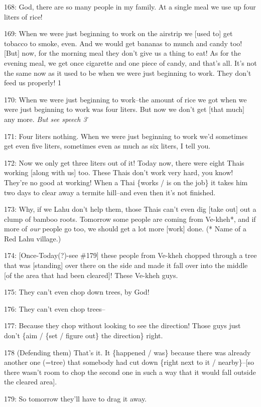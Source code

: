 168: God, there are so many people in my family. At a single meal we use up four
liters of rice!

169: When we were just beginning to work on the airstrip we [used to] get tobacco
to smoke, even. And we would get bananas to munch and candy too! [But] now, for
the morning meal they don't give us a thing to eat! As for the evening meal, we
get once cigarette and one piece of candy, and that's all. It's not the same now
as it used to be when we were just beginning to work. They don't feed us properly!
1

170: When we were just beginning to work--the amount of rice we got when we were
just beginning to work was four liters. But now we don't get [that much] any more.
\textit{But see speech 3\.}

171: Four liters nothing. When we were just beginning to work we'd sometimes get
even five liters, sometimes even as much as six liters, I tell you.

172: Now we only get three liters out of it! Today now, there were eight Thais
working [along with us] too. These Thais don't work very hard, you know! They're
no good at working! When a Thai \{works / is on the job\} it takes him two days
to clear away a termite hill--and even then it's not finished.

173: Why, if we Lahu don't help them, those Thais can't even dig [take out] out
a clump of bamboo roots. Tomorrow some people are coming from Ve-kheh*, and if
more of \textit{our} people go too, we should get a lot more [work] done. (* Name
of a Red Lahu village.)

174: [Once-Today(?)-see \#179] these people from Ve-kheh chopped through a tree
that was [standing] over there on the side and made it fall over into the middle
[of the area that had been cleared]! These Ve-kheh guys.

175: They can't even chop down trees, by God!

176: They can't even chop trees--

177: Because they chop without looking to see the direction! Those guys just don't
\{aim / \{set / figure out\} the direction\} right.

178 (Defending them) That's it. It \{happened / was\} because there was already
another one (=tree) that somebody had cut down \{right next to it / nearby\}--[so
there wasn't room to chop the second one in such a way that it would fall outside
the cleared area].

179: So tomorrow they'll have to drag it away.

